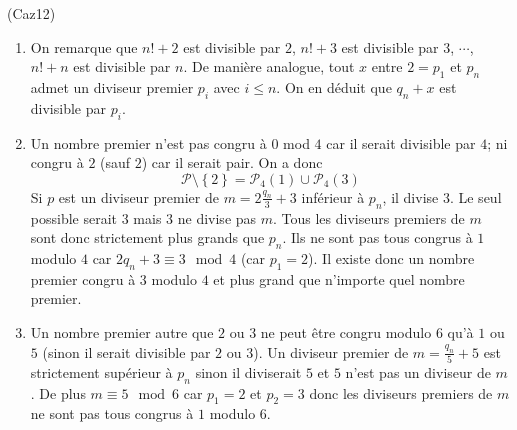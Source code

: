 \begin{tiny}(Caz12)\end{tiny}
\begin{enumerate}
  \item On remarque que $n!+2$ est divisible par $2$, $n!+3$ est divisible par $3$, $\cdots$, $n!+n$ est divisible par $n$.\newline
De manière analogue, tout $x$ entre $2=p_1$ et $p_n$ admet un diviseur premier $p_i$ avec $i\leq n$. On en déduit que $q_n +x$ est divisible par $p_i$. 
  \item Un nombre premier n'est pas congru à $0$ mod $4$ car il serait divisible par $4$; ni congru à $2$ (sauf $2$) car il serait pair. On a donc 
\begin{displaymath}
  \mathcal{P}\setminus\left\lbrace 2 \right\rbrace = \mathcal{P}_4(1) \cup \mathcal{P}_4(3)
\end{displaymath}
Si $p$ est un diviseur premier de $m = 2\frac{q_n}{3} +3$ inférieur à $p_n$, il divise $3$. Le seul possible serait $3$ mais $3$ ne divise pas $m$. Tous les diviseurs premiers de $m$ sont donc strictement plus grands que $p_n$. Ils ne sont pas tous congrus à $1$ modulo $4$ car $2q_n +3 \equiv 3 \mod 4$ (car $p_1=2$). Il existe donc un nombre premier congru à $3$ modulo $4$ et plus grand que n'importe quel nombre premier.
  \item Un nombre premier autre que $2$ ou $3$ ne peut être congru modulo $6$ qu'à $1$ ou $5$ (sinon il serait divisible par $2$ ou $3$). Un diviseur premier de $m = \frac{q_n}{5}+5$ est strictement supérieur à $p_n$ sinon il diviserait $5$ et $5$ n'est pas un diviseur de $m$. De plus $m\equiv 5 \mod 6$ car $p_1=2$ et $p_2=3$ donc les diviseurs premiers de $m$ ne sont pas tous congrus à $1$ modulo $6$.   
\end{enumerate}
